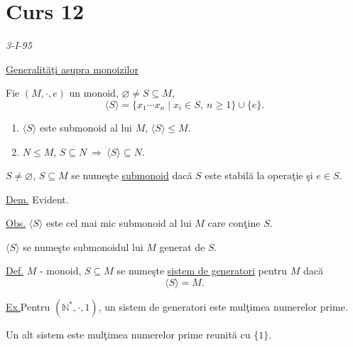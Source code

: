 
\newpage
\section{Curs 12}

\begin{center}
\end{center}
\begin{flushright}
\textit{3-I-95}
\end{flushright}

\medskip
\noindent\underline{Generalit\u{a}\c{t}i asupra monoizilor}

\bigskip
\noindent{}\quad Fie $(M,\cdot,e)$ un monoid, $\varnothing\neq S\subseteq M$,
\[
\langle S\rangle
=\{x_1\cdots x_n\mid x_i\in S,\ n\geq 1\}\cup\{e\}.
\]
\noindent
\begin{enumerate}
\item[(1)] $\langle S\rangle$ este submonoid al lui $M$, $\langle S\rangle\leq M$.
\item[(2)] $N\leq M$, $S\subseteq N\ \Longrightarrow\ \langle S\rangle\subseteq N$.
\end{enumerate}

\noindent $S\neq\varnothing$, $S\subseteq M$ se nume\c{s}te \underline{submonoid}
dac\u{a} $S$ este stabil\u{a} la opera\c{t}ie \c{s}i $e\in S$.

\bigskip
\noindent\underline{Dem.} Evident.

\bigskip
\noindent\underline{Obs.}\quad
$\langle S\rangle$ este cel mai mic submonoid al lui $M$ care con\c{t}ine $S$.

\medskip
\noindent $\langle S\rangle$ se nume\c{s}te submonoidul lui $M$ generat de $S$.

\bigskip
\noindent\underline{Def.}\quad
$M$ - monoid, $S\subseteq M$ se nume\c{s}te \underline{sistem de generatori}
pentru $M$ dac\u{a}
\[
\langle S\rangle=M.
\]

\bigskip
\noindent\underline{Ex.}\quad Pentru $(\mathbb{N}^{*},\cdot,1)$,
un sistem de generatori este mul\c{t}imea numerelor prime.

\noindent Un alt sistem este mul\c{t}imea numerelor prime reunit\u{a} cu $\{1\}$.

